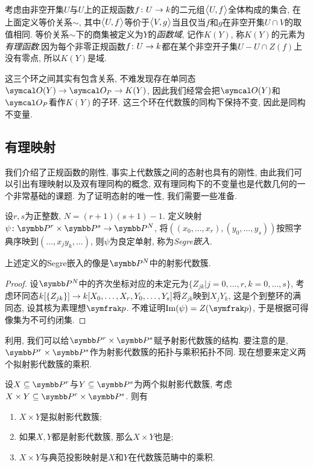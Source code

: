 考虑由非空开集$U$与$U$上的正规函数$f\colon U\to \kk$的二元组$\lrbig<>{U, f}$全体构成的集合, 在上面定义等价关系$\sim$, 其中$\lrbig<>{U, f}$等价于$\lrbig<>{V, g}$当且仅当$f$和$g$在非空开集$U\cap V$的取值相同. 等价关系$\sim$下的商集被定义为$Y$的\emph{函数域}, 记作$K(Y)$, 称$K(Y)$的元素为\emph{有理函数}.因为每个非零正规函数$f\colon U\to \kk$都在某个非空开子集$U-U\cap Z(f)$上没有零点, 所以$K(Y)$是域.

这三个环之间其实有包含关系, 不难发现存在单同态$\OO (Y)\to \OO_P\to K(Y)$, 因此我们经常会把$\OO (Y)$和$\OO_P$看作$K(Y)$的子环. 这三个环在代数簇的同构下保持不变, 因此是同构不变量.

\subsection{有理映射}

我们介绍了正规函数的刚性, 事实上代数簇之间的态射也具有的刚性, 由此我们可以引出有理映射以及双有理同构的概念, 双有理同构下的不变量也是代数几何的一个非常基础的课题. 为了证明态射的唯一性, 我们需要一些准备.

设$r, s$为正整数, $N=(r+1)(s+1)-1$. 定义映射$\psi\colon \PP^r\times\PP^s\to\PP^N$, 将$((x_0, \dotsc, x_r), (y_0, \dotsc, y_s))$按照字典序映到$(\dotsc, x_jy_k, \dotsc)$, 则$\psi$为良定单射, 称为\emph{Segre嵌入}.

\begin{proposition}\label{prop:segreembedding}
    上述定义的Segre嵌入的像是$\PP^N$中的射影代数簇.
\end{proposition}

\begin{proof}
    设$\PP^N$中的齐次坐标对应的未定元为$\{Z_{jk}\vert j=0, \dotsc, r, k=0, \dotsc, s\}$, 考虑环同态$\kk [\{Z_{jk}\}]\to \kk [X_0, \dotsc, X_r, Y_0, \dotsc, Y_s]$将$Z_{jk}$映到$X_jY_k$, 这是个到整环的满同态, 设其核为素理想$\ideal{p}$. 不难证明$\Im (\psi)=Z(\ideal{p})$, 于是根据可得像集为不可约闭集.
\end{proof}

利用, 我们可以给$\PP^r\times\PP^s$赋予射影代数簇的结构. 要注意的是, $\PP^r\times\PP^s$作为射影代数簇的拓扑与乘积拓扑不同. 现在想要来定义两个拟射影代数簇的乘积.

\begin{proposition}\label{prop:projectiveproduct}
    设$X\subseteq\PP^r$与$Y\subseteq\PP^s$为两个拟射影代数簇, 考虑$X\times Y\subseteq \PP^r\times\PP^s$. 则有
    \begin{enumerate}
        \item $X\times Y$是拟射影代数簇;
        \item 如果$X, Y$都是射影代数簇, 那么$X\times Y$也是;
        \item\label{enum:prop-projective-product-3} $X\times Y$与典范投影映射是$X$和$Y$在代数簇范畴中的乘积.
    \end{enumerate}
\end{proposition}


